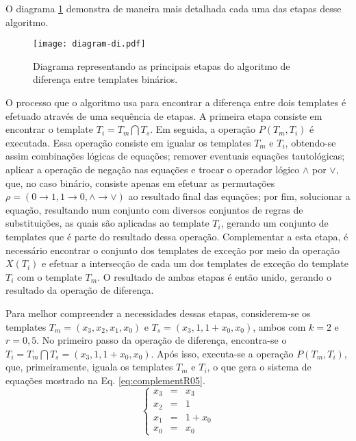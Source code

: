O diagrama \ref{fig:diagramInter} demonstra de maneira mais detalhada cada uma das etapas desse algoritmo.
\begin{figure}[h!]
  \centering
  \texttt{[image: diagram-di.pdf]}
  \caption{Diagrama representando as principais etapas do algoritmo de diferença entre templates binários.}
  \label{fig:diagramInter}
\end{figure}    

O processo que o algoritmo usa para encontrar a diferença entre dois templates é efetuado através de uma sequência de etapas. A primeira etapa consiste em encontrar o template $T_i = T_m \bigcap T_s$. Em seguida, a operação $P(T_m, T_i)$ é executada. Essa operação consiste em igualar os templates $T_m$ e $T_i$, obtendo-se assim combinações lógicas de equações; remover eventuais equações tautológicas; aplicar a operação de negação nas equações e trocar o operador lógico $\wedge$ por $\vee$, que, no caso binário, consiste apenas em efetuar as permutações $\rho = (0 \rightarrow 1, 1 \rightarrow 0, \wedge \rightarrow \vee)$ ao resultado final das equações; por fim, solucionar a equação, resultando num conjunto com diversos conjuntos de regras de substituições, as quais são aplicadas ao template $T_i$, gerando um conjunto de templates que é parte do resultado dessa operação. Complementar a esta etapa, é necessário encontrar o conjunto dos templates de exceção por meio da operação $X(T_i)$ e efetuar a intersecção de cada um dos templates de exceção do template $T_i$ com o template $T_m$. O resultado de ambas etapas é então unido, gerando o resultado da operação de diferença.

Para melhor compreender a necessidades dessas etapas, considerem-se os templates $T_m = (x_3, x_2, x_1, x_0)$ e $T_s = (x_3, 1, 1 + x_0, x_0)$, ambos com $k=2$ e $r=0,5$. No primeiro passo da operação de diferença, encontra-se o $T_i = T_m \bigcap T_s = (x_3, 1, 1 + x_0, x_0)$. Após isso, executa-se a operação $P(T_m, T_i)$, que, primeiramente, iguala os templates $T_m$ e $T_i$, o que gera o sistema de equações mostrado na Eq. \eqref{eq:complementR05}.
\begin{equation}
\left\{\begin{matrix}
x_3 & = & x_3	\\ 
x_2 & = & 1	\\ 
x_1 & = & 1+x_0	\\ 
x_0 & = & x_0
\end{matrix}\right.
\label{eq:complementR05}
\end{equation}

